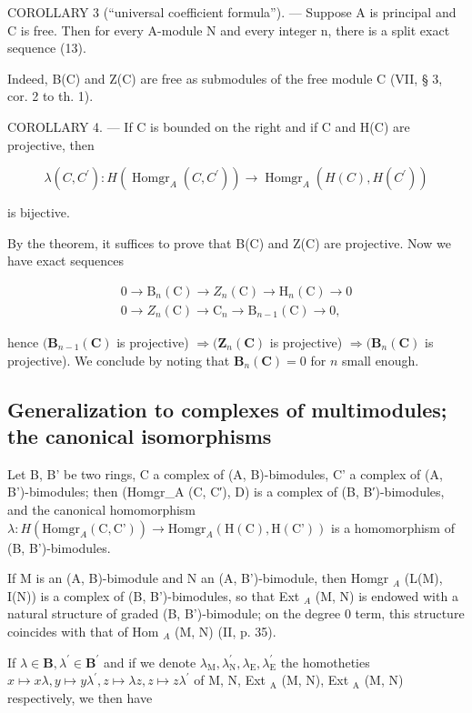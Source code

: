COROLLARY 3 (“universal coefficient formula”). --- Suppose A is principal and C is free. Then for every A-module N and every integer n, there is a split exact sequence (13).

Indeed, B(C) and Z(C) are free as submodules of the free module C (VII, § 3, cor. 2 to th. 1).

COROLLARY 4. --- If C is bounded on the right and if C and H(C) are projective, then

\[
\lambda (C, C ^ {\prime}): H \left(\operatorname{Homgr} _ {A} (C, C ^ {\prime})\right)\rightarrow \operatorname{Homgr} _ {A} \left(H (C), H \left(C ^ {\prime}\right)\right)
\]

is bijective.

By the theorem, it suffices to prove that B(C) and Z(C) are projective. Now we have exact sequences

\[
\begin{array}{l} 0 \to \mathrm{B} _ {n} (\mathrm{C}) \to Z _ {n} (\mathrm{C}) \to \mathrm{H} _ {n} (\mathrm{C}) \to 0 \\ 0 \to Z _ {n} (\mathrm{C}) \to \mathrm{C} _ {n} \to \mathrm{B} _ {n - 1} (\mathrm{C}) \to 0, \end{array}
\]

hence \((\mathbf{B}_{n - 1}(\mathbf{C})\) is projective) \(\Rightarrow (\mathbf{Z}_n(\mathbf{C})\) is projective) \(\Rightarrow (\mathbf{B}_n(\mathbf{C})\) is projective). We conclude by noting that \(\mathbf{B}_n(\mathbf{C}) = 0\) for \(n\) small enough.

\subsection{Generalization to complexes of multimodules; the canonical isomorphisms}

Let B, B' be two rings, C a complex of (A, B)-bimodules, C' a complex of (A, B')-bimodules; then (Homgr\_A (C, C′), D) is a complex of (B, B′)-bimodules, and the canonical homomorphism \(\lambda: H(\text{Homgr}_A (\text{C}, \text{C'})) \to \text{Homgr}_A (\text{H}(\text{C}), \text{H}(\text{C'}))\) is a homomorphism of (B, B')-bimodules.

If M is an (A, B)-bimodule and N an (A, B')-bimodule, then Homgr \(_{A}\) (L(M), I(N)) is a complex of (B, B')-bimodules, so that Ext \(_{A}\) (M, N) is endowed with a natural structure of graded (B, B')-bimodule; on the degree 0 term, this structure coincides with that of Hom \(_{A}\) (M, N) (II, p. 35).

If \(\lambda\in\mathbf{B},\lambda^{\prime}\in\mathbf{B}^{\prime}\) and if we denote \(\lambda_{\mathrm{M}},\lambda_{\mathrm{N}}^{\prime},\lambda_{\mathrm{E}},\lambda_{\mathrm{E}}^{\prime}\) the homotheties \(x\mapsto x\lambda,y\mapsto y\lambda^{\prime},z\mapsto\lambda z,z\mapsto z\lambda^{\prime}\) of M, N, Ext \(_{\mathrm{A}}\) (M, N), Ext \(_{\mathrm{A}}\) (M, N) respectively, we then have

